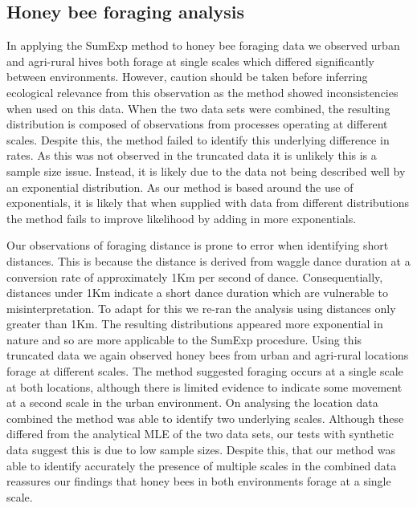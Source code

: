 \documentclass[11pt,usenames,dvipsnames]{article}
\begin{document}
\subsection{Honey bee foraging analysis}

In applying the SumExp method to honey bee foraging data we observed urban and agri-rural hives both forage at single scales which differed significantly between environments. However, caution should be taken before inferring ecological relevance from this observation as the method showed inconsistencies when used on this data. When the two data sets were combined, the resulting distribution is composed of observations from processes operating at different scales. Despite this, the method failed to identify this underlying difference in rates. As this was not observed in the truncated data it is unlikely this is a sample size issue. Instead, it is likely due to the data not being described well by an exponential distribution. As our method is based around the use of exponentials, it is likely that when supplied with data from different distributions the method fails to improve likelihood by adding in more exponentials.

Our observations of foraging distance is prone to error when identifying short distances. This is because the distance is derived from waggle dance duration at a conversion rate of approximately 1Km per second of dance. Consequentially, distances under 1Km indicate a short dance duration which are vulnerable to misinterpretation. To adapt for this we re-ran the analysis using distances only greater than 1Km. The resulting distributions appeared more exponential in nature and so are more applicable to the SumExp procedure. Using this truncated data we again observed honey bees from urban and agri-rural locations forage at different scales. The method suggested foraging occurs at a single scale at both locations, although there is limited evidence to indicate some movement at a second scale in the urban environment. On analysing the location data combined the method was able to identify two underlying scales. Although these differed from the analytical MLE of the two data sets, our tests with synthetic data suggest this is due to low sample sizes. Despite this, that our method was able to identify accurately the presence of multiple scales in the combined data reassures our findings that honey bees in both environments forage at a single scale. 
\end{document}
